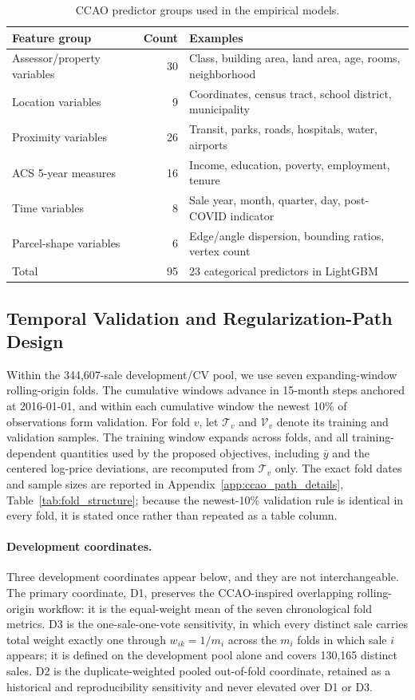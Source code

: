 \documentclass[10pt]{article}
\theoremstyle{definition}
\newcommand{\1}{\mathbf{1}}
\begin{document}
{
\begin{table}[!ht]
\centering
\caption{CCAO predictor groups used in the empirical models.}
\label{tab:feature_groups}
\begin{tabular}{lrl}
\toprule
Feature group & Count & Examples \\
\midrule
Assessor/property variables & 30 & Class, building area, land area, age, rooms, neighborhood \\
Location variables & 9 & Coordinates, census tract, school district, municipality \\
Proximity variables & 26 & Transit, parks, roads, hospitals, water, airports \\
ACS 5-year measures & 16 & Income, education, poverty, employment, tenure \\
Time variables & 8 & Sale year, month, quarter, day, post-COVID indicator \\
Parcel-shape variables & 6 & Edge/angle dispersion, bounding ratios, vertex count \\
\midrule
Total & 95 & 23 categorical predictors in LightGBM \\
\bottomrule
\end{tabular}
\end{table}
}


\subsection{Temporal Validation and Regularization-Path Design}
\label{subsec:path_design}

Within the 344,607-sale development/CV pool, we use seven expanding-window
rolling-origin folds. The cumulative windows advance in 15-month steps anchored at
2016-01-01, and within each cumulative window the newest 10\% of observations form
validation. For fold $v$, let $\mathcal T_v$ and $\mathcal V_v$ denote its training
and validation samples. The training window expands across folds, and all
training-dependent quantities used by the proposed objectives, including $\bar y$
and the centered log-price deviations, are recomputed from $\mathcal T_v$ only.
The exact fold dates and sample sizes are reported in Appendix~\ref{app:ccao_path_details}, Table~\ref{tab:fold_structure}; because the newest-10\% validation rule is identical in every fold, it is stated once rather than repeated as a table column.

\paragraph{Development coordinates.}
Three development coordinates appear below, and they are not interchangeable.
The primary coordinate, D1, preserves the CCAO-inspired overlapping rolling-origin
workflow: it is the equal-weight mean of the seven chronological fold metrics. D3 is the
one-sale-one-vote sensitivity, in which every distinct sale carries total weight exactly
one through $w_{ik}=1/m_i$ across the $m_i$ folds in which sale $i$ appears; it is defined
on the development pool alone and covers 130,165 distinct sales. D2 is the
duplicate-weighted pooled out-of-fold coordinate, retained as a historical and
reproducibility sensitivity and never elevated over D1 or D3.
\end{document}
